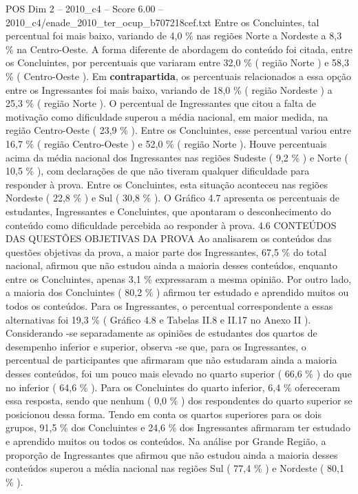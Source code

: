 \begin{textsample}{POS Dim 2 – 2010\_c4 – Score 6.00 – 2010\_c4/enade\_2010\_ter\_ocup\_b707218cef.txt}
Entre os Concluintes, tal percentual foi mais baixo, variando de 4,0 \% nas regiões Norte a Nordeste a 8,3 \% na Centro-Oeste.
A forma diferente de abordagem do conteúdo foi citada, entre os Concluintes, por percentuais que variaram entre 32,0 \% ( região Norte ) e 58,3 \% ( Centro-Oeste ).
Em \textbf{contrapartida}, os percentuais relacionados a essa opção entre os Ingressantes foi mais baixo, variando de 18,0 \% ( região Nordeste ) a 25,3 \% ( região Norte ).
O percentual de Ingressantes que citou a falta de motivação como dificuldade superou a média nacional, em maior medida, na região Centro-Oeste ( 23,9 \% ).
Entre os Concluintes, esse percentual variou entre 16,7 \% ( região Centro-Oeste ) e 52,0 \% ( região Norte ).
Houve percentuais acima da média nacional dos Ingressantes nas regiões Sudeste ( 9,2 \% ) e Norte ( 10,5 \% ), com declarações de que não tiveram qualquer dificuldade para responder à prova.
Entre os Concluintes, esta situação aconteceu nas regiões Nordeste ( 22,8 \% ) e Sul ( 30,8 \% ).
O Gráfico 4.7 apresenta os percentuais de estudantes, Ingressantes e Concluintes, que apontaram o desconhecimento do conteúdo como dificuldade percebida ao responder à prova. 4.6 CONTEÚDOS DAS QUESTÕES OBJETIVAS DA PROVA Ao analisarem os conteúdos das questões objetivas da prova, a maior parte dos Ingressantes, 67,5 \% do total nacional, afirmou que não estudou ainda a maioria desses conteúdos, enquanto entre os Concluintes, apenas 3,1 \% expressaram a mesma opinião.
Por outro lado, a maioria dos Concluintes ( 80,2 \% ) afirmou ter estudado e aprendido muitos ou todos os conteúdos.
Para os Ingressantes, o percentual correspondente a essas alternativas foi 19,3 \% ( Gráfico 4.8 e Tabelas II.8 e II.17 no Anexo II ).
Considerando -se separadamente as opiniões de estudantes dos quartos de desempenho inferior e superior, observa -se que, para os Ingressantes, o percentual de participantes que afirmaram que não estudaram ainda a maioria desses conteúdos, foi um pouco mais elevado no quarto superior ( 66,6 \% ) do que no inferior ( 64,6 \% ).
Para os Concluintes do quarto inferior, 6,4 \% ofereceram essa resposta, sendo que nenhum ( 0,0 \% ) dos respondentes do quarto superior se posicionou dessa forma.
Tendo em conta os quartos superiores para os dois grupos, 91,5 \% dos Concluintes e 24,6 \% dos Ingressantes afirmaram ter estudado e aprendido muitos ou todos os conteúdos.
Na análise por Grande Região, a proporção de Ingressantes que afirmou que não estudou ainda a maioria desses conteúdos superou a média nacional nas regiões Sul ( 77,4 \% ) e Nordeste ( 80,1 \% ).

\end{textsample}
